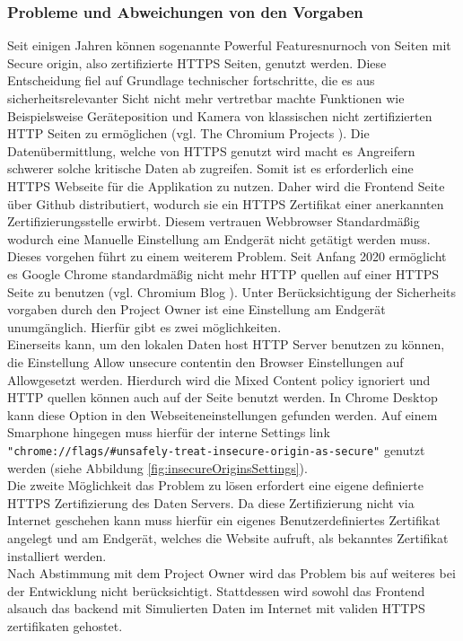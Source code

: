 \subsubsection{Probleme und Abweichungen von den Vorgaben}
Seit einigen Jahren können sogenannte \grqq Powerful Features\grqq\space nurnoch von Seiten mit \grqq Secure origin\grqq , also zertifizierte HTTPS Seiten, genutzt werden. Diese Entscheidung fiel auf Grundlage technischer fortschritte, die es aus sicherheitsrelevanter Sicht nicht mehr vertretbar machte Funktionen wie Beispielsweise Geräteposition und Kamera von klassischen nicht zertifizierten HTTP Seiten zu ermöglichen (vgl. The Chromium Projects \cite{CameraHTTPSOnly}). Die Datenübermittlung, welche von HTTPS genutzt wird macht es Angreifern schwerer solche kritische Daten ab zugreifen. Somit ist es erforderlich eine HTTPS Webseite für die Applikation zu nutzen. Daher wird die Frontend Seite über Github distributiert, wodurch sie ein HTTPS Zertifikat einer anerkannten Zertifizierungsstelle erwirbt. Diesem vertrauen Webbrowser Standardmäßig wodurch eine Manuelle Einstellung am Endgerät nicht getätigt werden muss.\\
Dieses vorgehen führt zu einem weiterem Problem. Seit Anfang 2020 ermöglicht es Google Chrome standardmäßig nicht mehr HTTP quellen auf einer HTTPS Seite zu benutzen (vgl. Chromium Blog \cite{MixedSourcesPolicy}). Unter Berücksichtigung der Sicherheits vorgaben durch den Project Owner ist eine Einstellung am Endgerät unumgänglich. Hierfür gibt es zwei möglichkeiten.\\
Einerseits kann, um den lokalen Daten host HTTP Server benutzen zu können, die Einstellung \grqq Allow unsecure content\grqq\space in den Browser Einstellungen auf \grqq Allow\grqq\space gesetzt werden. Hierdurch wird die Mixed Content policy ignoriert und HTTP quellen können auch auf der Seite benutzt werden. In Chrome Desktop kann diese Option in den Webseiteneinstellungen gefunden werden. Auf einem Smarphone hingegen muss hierfür der interne Settings link \verb|"chrome://flags/#unsafely-treat-insecure-origin-as-secure"| genutzt werden (siehe Abbildung \ref{fig:insecureOriginsSettings}).\\
Die zweite Möglichkeit das Problem zu lösen erfordert eine eigene definierte HTTPS Zertifizierung des Daten Servers. Da diese Zertifizierung nicht via Internet geschehen kann muss hierfür ein eigenes Benutzerdefiniertes Zertifikat angelegt und am Endgerät, welches die Website aufruft, als bekanntes Zertifikat installiert werden.\\ 
Nach Abstimmung mit dem Project Owner wird das Problem bis auf weiteres bei der Entwicklung nicht berücksichtigt. Stattdessen wird sowohl das Frontend alsauch das backend mit Simulierten Daten im Internet mit validen HTTPS zertifikaten gehostet.

